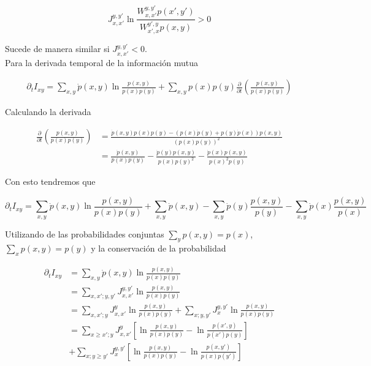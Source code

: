 \begin{appendixs}
\begin{equation*}
    J_{x,x'}^{y,y'} \ln \frac{ W_{x,x'}^{y,y'}p(x',y') }{ W_{x',x}^{y',y}p(x,y) } > 0
\end{equation*}

Sucede de manera similar si $J_{x,x'}^{y,y'}<0$.\\
 Para la derivada temporal de la información mutua 

\begin{align*}
    \partial_{t} I_{xy} = \sum_{x,y}\dot{p}(x,y) \ln \frac{p(x,y) }{ p(x)p(y) } + \sum_{x,y}p(x)p(y) \frac{\partial}{\partial t} \left( \frac{p(x,y)}{p(x)p(y)} \right)
 \end{align*}

 Calculando la derivada

\begin{align*}
    \frac{\partial }{\partial t} \left( \frac{p(x,y)}{p(x)p(y)} \right) & = \frac{ \dot{p}(x,y)p(x)p(y) - (p(x)\dot{p}(y) + p(y)\dot{p}(x))p(x,y)   }{ (p(x)p(y))^{2} } \\
    & = \frac{\dot{p}(x,y)}{p(x)p(y) } - \frac{\dot{p}(y)p(x,y)  }{ p(x)p(y)^{2} } - \frac{\dot{p}(x)p(x,y)  }{ p(x)^{2}p(y) }  
\end{align*}

Con esto tendremos que

\begin{equation*}
    \partial_{t}I_{xy} = \sum_{x,y}\dot{p}(x,y) \ln \frac{p(x,y)}{ p(x)p(y) } + \sum_{x,y} \dot{p}(x,y) - \sum_{x,y} \dot{p}(y) \frac{p(x,y)}{p(y)} - \sum_{x,y} \dot{p}(x) \frac{p(x,y)}{p(x)} 
\end{equation*}

Utilizando de las probabilidades conjuntas $\sum_{y}p(x,y) = p(x)$, $\sum_{x}p(x,y)  = p(y)$ y la conservación de la probabilidad

\begin{align*}
    \partial_{t}I_{xy} & = \sum_{x,y}\dot{p}(x,y) \ln \frac{p(x,y)}{ p(x)p(y) } \\
    & = \sum_{x,x';y,y'}J_{x,x'}^{y,y'} \ln \frac{p(x,y)}{ p(x)p(y) } \\
    & = \sum_{x,x';y}J_{x,x'}^{y} \ln \frac{p(x,y)}{p(x)p(y)} + \sum_{x;y,y'}J_{x}^{y,y'} \ln \frac{p(x,y)}{p(x)p(y)} \\
    & = \sum_{x\geq x';y}J_{x,x'}^{y} \left[ \ln \frac{p(x,y)}{p(x)p(y)} - \ln \frac{p(x',y)}{p(x')p(y)}  \right] \\
    & + \sum_{x;y\geq y'} J_{x}^{y,y'} \left[ \ln \frac{p(x,y)}{p(x)p(y)} - \ln \frac{p(x,y')}{p(x)p(y')} \right]
\end{align*}


\end{appendixs}
